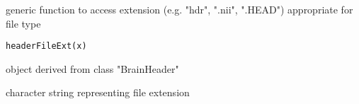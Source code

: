 \begin{Description}\relax
generic function to access extension (e.g. "hdr", ".nii", ".HEAD")
appropriate for file type
\end{Description}
\begin{Usage}
\begin{verbatim}
headerFileExt(x)
\end{verbatim}
\end{Usage}
\begin{Arguments}
\begin{ldescription}
\item[\code{x}] object derived from class "BrainHeader" 
\end{ldescription}
\end{Arguments}
\begin{Value}
character string representing file extension
\end{Value}


